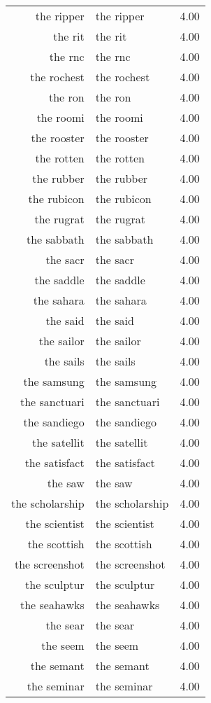 \begin{table}[ht]
\begin{tabular}{rlr}
  the ripper & the ripper & 4.00 \\ 
  the rit & the rit & 4.00 \\ 
  the rnc & the rnc & 4.00 \\ 
  the rochest & the rochest & 4.00 \\ 
  the ron & the ron & 4.00 \\ 
  the roomi & the roomi & 4.00 \\ 
  the rooster & the rooster & 4.00 \\ 
  the rotten & the rotten & 4.00 \\ 
  the rubber & the rubber & 4.00 \\ 
  the rubicon & the rubicon & 4.00 \\ 
  the rugrat & the rugrat & 4.00 \\ 
  the sabbath & the sabbath & 4.00 \\ 
  the sacr & the sacr & 4.00 \\ 
  the saddle & the saddle & 4.00 \\ 
  the sahara & the sahara & 4.00 \\ 
  the said & the said & 4.00 \\ 
  the sailor & the sailor & 4.00 \\ 
  the sails & the sails & 4.00 \\ 
  the samsung & the samsung & 4.00 \\ 
  the sanctuari & the sanctuari & 4.00 \\ 
  the sandiego & the sandiego & 4.00 \\ 
  the satellit & the satellit & 4.00 \\ 
  the satisfact & the satisfact & 4.00 \\ 
  the saw & the saw & 4.00 \\ 
  the scholarship & the scholarship & 4.00 \\ 
  the scientist & the scientist & 4.00 \\ 
  the scottish & the scottish & 4.00 \\ 
  the screenshot & the screenshot & 4.00 \\ 
  the sculptur & the sculptur & 4.00 \\ 
  the seahawks & the seahawks & 4.00 \\ 
  the sear & the sear & 4.00 \\ 
  the seem & the seem & 4.00 \\ 
  the semant & the semant & 4.00 \\ 
  the seminar & the seminar & 4.00 \\ 

\end{tabular}
\end{table}
